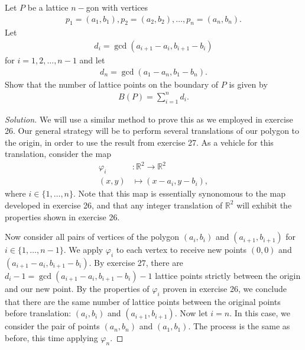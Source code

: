 \documentclass[12pt]{article}
\newcommand{\R}{\mathbb{R}}
\newenvironment{exercise}[2][Exercise]{\begin{trivlist}
        \item[\hskip \labelsep {\bfseries #1}\hskip \labelsep {\bfseries #2.}]}{\end{trivlist}}
\newenvironment{solution}
        {\begin{proof}[Solution]}
                    {\end{proof}}
\begin{document}
\begin{exercise}{28}
    Let \( P \) be a lattice \( n- \)gon with vertices
    \begin{align*}
        p_{1} = ( a_{1} , b_{1} ), p_{2} = ( a_{2} , b_{2} ), \ldots , p_{n} = ( a_{n} , b_{n} ) .
    \end{align*}
    Let
    \begin{align*}
        d_{i} = \gcd ( a_{i + 1} - a_{i} , b_{i + 1} - b_{i} )
    \end{align*}
    for \( i = 1,2,\ldots,n-1 \) and let
    \begin{align*}
        d_{n} = \gcd(a_{1} - a_{n} , b_{1} - b_{n} ).
    \end{align*}
    Show that the number of lattice points on the boundary of \( P \) is given by
    \begin{align*}
        B(P) = \sum_{i=1}^nd_{i} .
    \end{align*}
    \begin{solution}
        We will use a similar method to prove this as we employed in exercise 26. Our general strategy will be to perform several translations of our polygon to the origin, in order to use the result from exercise 27. As a vehicle for this translation, consider the map
        \begin{align*}
            \varphi_{i} &: \R^{2} \to \R^{2} \\
             ( x,y ) &\mapsto ( x - a_{i} , y - b_{i} ),
        \end{align*}
        where \( i \in \{ 1, \ldots, n \} . \) Note that this map is essentially synonomous to the map developed in exercise 26, and that any integer translation of \( \R^{2} \) will exhibit the properties shown in exercise 26.

        Now consider all pairs of vertices of the polygon \( ( a_{i} , b_{i} ) \) and \( ( a_{i + 1} , b_{i+1} )  \) for \( i \in \{ 1, \ldots, n-1 \} . \) We apply \( \varphi_{i} \) to each vertex to receive new points \( ( 0,0 ) \) and \( ( a_{i + 1} - a_{i} , b_{i+1} - b_{i} ) . \) By exercise 27, there are \( d_{i} - 1 = \gcd(a_{i+1} - a_{i} , b_{i+1} - b_{i}) -1 \) lattice points strictly between the origin and our new point. By the properties of \( \varphi_{i} \) proven in exercise 26, we conclude that there are the same number of lattice points between the original points before translation: \( ( a_{i} , b_{i} ) \) and \( ( a_{i + 1} ,b_{i+1} ) . \) Now let \( i = n. \) In this case, we consider the pair of points \( ( a_{n} , b_{n} ) \) and \( ( a_{1}, b_{1} ) . \) The process is the same as before, this time applying \( \varphi_{n} . \)


\end{solution}
\end{exercise}
\end{document}
